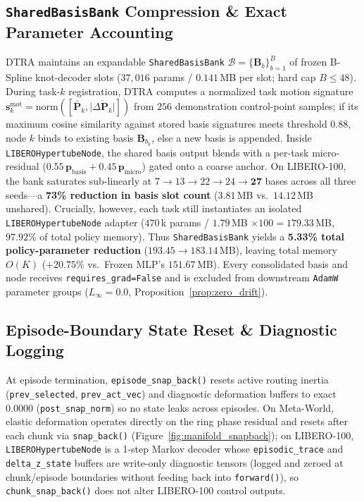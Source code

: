 \documentclass[10pt]{article}
\begin{document}
\subsection{\texttt{SharedBasisBank} Compression \& Exact Parameter Accounting}
DTRA maintains an expandable \texttt{SharedBasisBank} $\mathcal{B} = \{\mathbf{B}_b\}_{b=1}^{B}$ of frozen B-Spline knot-decoder slots ($37{,}016$ params / $0.141\,$MB per slot; hard cap $B \le 48$). During task-$k$ registration, DTRA computes a normalized task motion signature $\mathbf{s}_k^{\text{mot}} = \mathrm{norm}([\bar{\mathbf{P}}_k, \overline{|\Delta\mathbf{P}_k|}])$ from $256$ demonstration control-point samples; if its maximum cosine similarity against stored basis signatures meets threshold $0.88$, node $k$ binds to existing basis $\mathbf{B}_{b_k}$, else a new basis is appended. Inside \texttt{LIBEROHypertubeNode}, the shared basis output blends with a per-task micro-residual ($0.55\,\mathbf{p}_{\text{basis}} + 0.45\,\mathbf{p}_{\text{micro}}$) gated onto a coarse anchor. On LIBERO-100, the bank saturates sub-linearly at $7 \to 13 \to 22 \to 24 \to \mathbf{27}$ bases across all three seeds---a \textbf{73\% reduction in basis slot count} ($3.81\,$MB vs.\ $14.12\,$MB unshared). Crucially, however, each task still instantiates an isolated \texttt{LIBEROHypertubeNode} adapter ($470\,$k params / $1.79\,$MB $\times 100 = 179.33\,$MB, $97.92\%$ of total policy memory). Thus \texttt{SharedBasisBank} yields a \textbf{5.33\% total policy-parameter reduction} ($193.45 \to 183.14\,$MB), leaving total memory $O(K)$ ($+20.75\%$ vs.\ Frozen MLP's $151.67\,$MB). Every consolidated basis and node receives \texttt{requires\_grad=False} and is excluded from downstream \texttt{AdamW} parameter groups ($L_\infty = 0.0$, Proposition~\ref{prop:zero_drift}).

\subsection{Episode-Boundary State Reset \& Diagnostic Logging}
\label{sec:state_reset}
At episode termination, \texttt{episode\_snap\_back()} resets active routing inertia (\texttt{prev\_selected}, \texttt{prev\_act\_vec}) and diagnostic deformation buffers to exact $0.0000$ (\texttt{post\_snap\_norm}) so no state leaks across episodes. On Meta-World, elastic deformation operates directly on the ring phase residual and resets after each chunk via \texttt{snap\_back()} (Figure~\ref{fig:manifold_snapback}); on LIBERO-100, \texttt{LIBEROHypertubeNode} is a 1-step Markov decoder whose \texttt{episodic\_trace} and \texttt{delta\_z\_state} buffers are write-only diagnostic tensors (logged and zeroed at chunk/episode boundaries without feeding back into \texttt{forward()}), so \texttt{chunk\_snap\_back()} does not alter LIBERO-100 control outputs.
\end{document}
